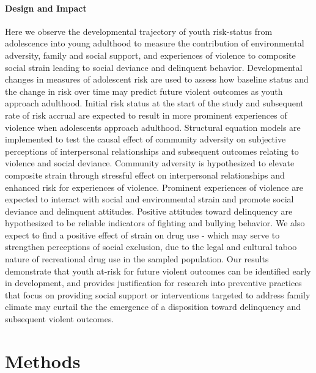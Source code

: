 \documentclass[utf8]{frontiersSCNS} %
\begin{document}
\paragraph{Design and Impact}
Here we observe the developmental trajectory of youth risk-status from adolescence into young adulthood to measure the contribution of environmental adversity, family and social support, and experiences of violence to composite social strain leading to social deviance and delinquent behavior. Developmental changes in  measures of adolescent risk are used to assess how baseline status and the change in risk over time may predict future violent outcomes as youth approach adulthood. Initial risk status at the start of the study and subsequent rate of risk accrual are expected to result in more prominent experiences of violence when adolescents approach adulthood. Structural equation models are implemented to test the causal effect of community adversity on subjective perceptions of interpersonal relationships and subsequent outcomes relating to violence and social deviance. Community adversity is hypothesized to elevate composite strain through stressful effect on interpersonal relationships and enhanced risk for experiences of violence. Prominent experiences of violence are expected to interact with social and environmental strain and promote social deviance and delinquent attitudes. Positive attitudes toward delinquency are hypothesized to be reliable indicators of fighting and bullying behavior. We also expect to find a positive effect of strain on drug use - which may serve to strengthen perceptions of social exclusion, due to the legal and cultural taboo nature of recreational drug use in the sampled population. Our results demonstrate that youth at-risk for future violent outcomes can be identified early in development, and provides justification for research into preventive practices that focus on providing social support or interventions targeted to address family climate may curtail the the emergence of a disposition toward delinquency and subsequent violent outcomes.
\section{Methods}
\end{document}
